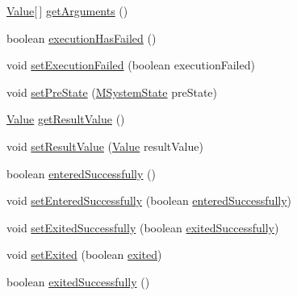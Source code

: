 \begin{DoxyCompactItemize}
\hyperlink{classorg_1_1tzi_1_1use_1_1uml_1_1ocl_1_1value_1_1_value}{Value}\mbox{[}$\,$\mbox{]} \hyperlink{classorg_1_1tzi_1_1use_1_1uml_1_1sys_1_1_m_operation_call_a33ec80c7db81085cd8758c3470fea1e1}{get\-Arguments} ()
\item 
boolean \hyperlink{classorg_1_1tzi_1_1use_1_1uml_1_1sys_1_1_m_operation_call_a8643c7e417d32479022dcc6bfba928b9}{execution\-Has\-Failed} ()
\item 
void \hyperlink{classorg_1_1tzi_1_1use_1_1uml_1_1sys_1_1_m_operation_call_a8a3451613ad2eea220ab450e9c9a8529}{set\-Execution\-Failed} (boolean execution\-Failed)
\item 
void \hyperlink{classorg_1_1tzi_1_1use_1_1uml_1_1sys_1_1_m_operation_call_af8b4660ceee3bdf70fb9d003d70fcf6b}{set\-Pre\-State} (\hyperlink{classorg_1_1tzi_1_1use_1_1uml_1_1sys_1_1_m_system_state}{M\-System\-State} pre\-State)
\item 
\hyperlink{classorg_1_1tzi_1_1use_1_1uml_1_1ocl_1_1value_1_1_value}{Value} \hyperlink{classorg_1_1tzi_1_1use_1_1uml_1_1sys_1_1_m_operation_call_aedbf46494693d1e16acb62b0cdc2098e}{get\-Result\-Value} ()
\item 
void \hyperlink{classorg_1_1tzi_1_1use_1_1uml_1_1sys_1_1_m_operation_call_ad21c99f6af9b5aa222ceef5fa6d872dc}{set\-Result\-Value} (\hyperlink{classorg_1_1tzi_1_1use_1_1uml_1_1ocl_1_1value_1_1_value}{Value} result\-Value)
\item 
boolean \hyperlink{classorg_1_1tzi_1_1use_1_1uml_1_1sys_1_1_m_operation_call_aa994f111389adde6d84d4b44c59e1f5e}{entered\-Successfully} ()
\item 
void \hyperlink{classorg_1_1tzi_1_1use_1_1uml_1_1sys_1_1_m_operation_call_a6302e7fd1787c771c0786d336cd787bc}{set\-Entered\-Successfully} (boolean \hyperlink{classorg_1_1tzi_1_1use_1_1uml_1_1sys_1_1_m_operation_call_aa994f111389adde6d84d4b44c59e1f5e}{entered\-Successfully})
\item 
void \hyperlink{classorg_1_1tzi_1_1use_1_1uml_1_1sys_1_1_m_operation_call_a2691e9f96c6a7f6b1d4dd8e530eda9f3}{set\-Exited\-Successfully} (boolean \hyperlink{classorg_1_1tzi_1_1use_1_1uml_1_1sys_1_1_m_operation_call_a5e496f13b89d1166b44551db2e898cb1}{exited\-Successfully})
\item 
void \hyperlink{classorg_1_1tzi_1_1use_1_1uml_1_1sys_1_1_m_operation_call_aadd20d30042fb2b35c52e500c8948246}{set\-Exited} (boolean \hyperlink{classorg_1_1tzi_1_1use_1_1uml_1_1sys_1_1_m_operation_call_a43bea728c438b67068d9aacf900e7235}{exited})
\item 
boolean \hyperlink{classorg_1_1tzi_1_1use_1_1uml_1_1sys_1_1_m_operation_call_a5e496f13b89d1166b44551db2e898cb1}{exited\-Successfully} ()

\end{DoxyCompactItemize}
